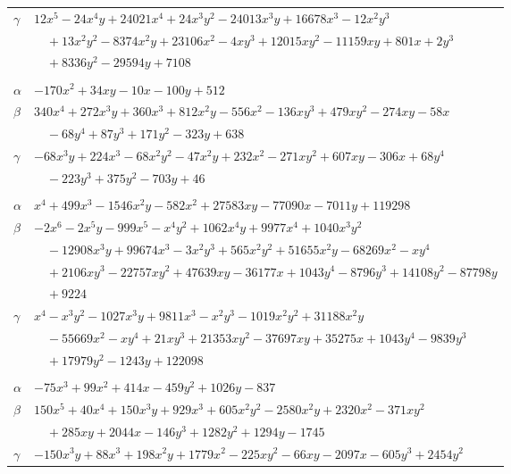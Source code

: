 \documentclass[11pt]{article}
\begin{document}
\begin{longtable}{@{}ll@{}}
$\gamma$ & $12x^{5}-24x^{4}y+24021x^{4}+24x^{3}y^{2}-24013x^{3}y+16678x^{3}-12x^{2}y^{3}$\\
 & $\quad +13x^{2}y^{2}-8374x^{2}y+23106x^{2}-4xy^{3}+12015xy^{2}-11159xy+801x+2y^{3}$\\
 & $\quad +8336y^{2}-29594y+7108$\\
\addlinespace[3pt]
\multicolumn{2}{@{}l}{$\{i,j\}=\{12,132\}$, $k_{ij}=2^{4}\cdot 7\cdot 19$}\\
$\alpha$ & $-170x^{2}+34xy-10x-100y+512$\\
$\beta$ & $340x^{4}+272x^{3}y+360x^{3}+812x^{2}y-556x^{2}-136xy^{3}+479xy^{2}-274xy-58x$\\
 & $\quad -68y^{4}+87y^{3}+171y^{2}-323y+638$\\
$\gamma$ & $-68x^{3}y+224x^{3}-68x^{2}y^{2}-47x^{2}y+232x^{2}-271xy^{2}+607xy-306x+68y^{4}$\\
 & $\quad -223y^{3}+375y^{2}-703y+46$\\
\addlinespace[3pt]
\multicolumn{2}{@{}l}{$\{i,j\}=\{12,133\}$, $k_{ij}=2^{8}\cdot 3\cdot 7^{2}\cdot 13$}\\
$\alpha$ & $x^{4}+499x^{3}-1546x^{2}y-582x^{2}+27583xy-77090x-7011y+119298$\\
$\beta$ & $-2x^{6}-2x^{5}y-999x^{5}-x^{4}y^{2}+1062x^{4}y+9977x^{4}+1040x^{3}y^{2}$\\
 & $\quad -12908x^{3}y+99674x^{3}-3x^{2}y^{3}+565x^{2}y^{2}+51655x^{2}y-68269x^{2}-xy^{4}$\\
 & $\quad +2106xy^{3}-22757xy^{2}+47639xy-36177x+1043y^{4}-8796y^{3}+14108y^{2}-87798y$\\
 & $\quad +9224$\\
$\gamma$ & $x^{4}-x^{3}y^{2}-1027x^{3}y+9811x^{3}-x^{2}y^{3}-1019x^{2}y^{2}+31188x^{2}y$\\
 & $\quad -55669x^{2}-xy^{4}+21xy^{3}+21353xy^{2}-37697xy+35275x+1043y^{4}-9839y^{3}$\\
 & $\quad +17979y^{2}-1243y+122098$\\
\addlinespace[3pt]
\multicolumn{2}{@{}l}{$\{i,j\}=\{12,134\}$, $k_{ij}=2^{6}\cdot 3\cdot 7$}\\
$\alpha$ & $-75x^{3}+99x^{2}+414x-459y^{2}+1026y-837$\\
$\beta$ & $150x^{5}+40x^{4}+150x^{3}y+929x^{3}+605x^{2}y^{2}-2580x^{2}y+2320x^{2}-371xy^{2}$\\
 & $\quad +285xy+2044x-146y^{3}+1282y^{2}+1294y-1745$\\
$\gamma$ & $-150x^{3}y+88x^{3}+198x^{2}y+1779x^{2}-225xy^{2}-66xy-2097x-605y^{3}+2454y^{2}$\\

\end{longtable}
\end{document}
